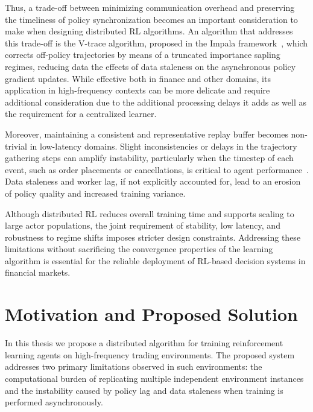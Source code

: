 Thus, a trade-off between minimizing communication overhead and preserving the timeliness of policy synchronization
becomes an important consideration to make when designing distributed RL algorithms.
An algorithm that addresses this trade-off is the V-trace algorithm, proposed in the Impala framework~\citep{Espeholt2018},
which corrects off-policy trajectories by means of a truncated importance sapling regimes,
reducing data the effects of data staleness on the asynchronous policy gradient updates.
While effective both in finance and other domains, its application in high-frequency contexts can be more delicate
and require additional consideration due to the additional processing delays it adds as well as the requirement for a
centralized learner.

Moreover, maintaining a consistent and representative replay buffer becomes non-trivial in low-latency domains.
Slight inconsistencies or delays in the trajectory gathering steps can amplify instability,
particularly when the timestep of each event, such as order placements or cancellations, is critical to agent performance~\citep{Zhang2024, Kopic2024}.
Data staleness and worker lag, if not explicitly accounted for, lead to an erosion of policy quality and increased training variance.

Although distributed RL reduces overall training time and supports scaling to large actor populations,
the joint requirement of stability, low latency, and robustness to regime shifts imposes stricter design constraints.
Addressing these limitations without sacrificing the convergence properties of the learning algorithm is essential
for the reliable deployment of RL-based decision systems in financial markets.

\section{Motivation and Proposed Solution}
\label{sec:motivation}

In this thesis we propose a distributed algorithm for training reinforcement learning agents on high-frequency trading environments.
The proposed system addresses two primary limitations observed in such environments:
the computational burden of replicating multiple independent environment instances and the instability caused by
policy lag and data staleness when training is performed asynchronously.

